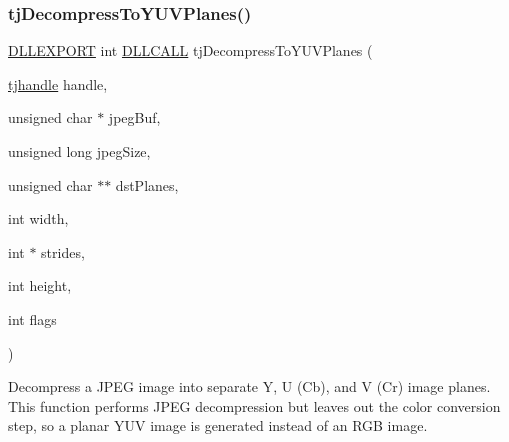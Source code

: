 \subsubsection{\texorpdfstring{tj\+Decompress\+To\+Y\+U\+V\+Planes()}{tjDecompressToYUVPlanes()}}
{\footnotesize\ttfamily \hyperlink{turbojpeg_8h_a808e08638be3cba36e36759e5b150de0}{D\+L\+L\+E\+X\+P\+O\+RT} int \hyperlink{turbojpeg_8h_a54b25836118bfac94a53a7b790f3ccb2}{D\+L\+L\+C\+A\+LL} tj\+Decompress\+To\+Y\+U\+V\+Planes (\begin{DoxyParamCaption}\item[{\hyperlink{group___turbo_j_p_e_g_ga758d2634ecb4949de7815cba621f5763}{tjhandle}}]{handle,  }\item[{unsigned char $\ast$}]{jpeg\+Buf,  }\item[{unsigned long}]{jpeg\+Size,  }\item[{unsigned char $\ast$$\ast$}]{dst\+Planes,  }\item[{int}]{width,  }\item[{int $\ast$}]{strides,  }\item[{int}]{height,  }\item[{int}]{flags }\end{DoxyParamCaption})}

Decompress a J\+P\+EG image into separate Y, U (Cb), and V (Cr) image planes. This function performs J\+P\+EG decompression but leaves out the color conversion step, so a planar Y\+UV image is generated instead of an R\+GB image.


